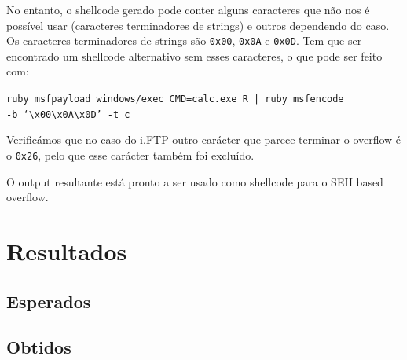 \documentclass[a4paper]{article}
\begin{document}
No entanto, o shellcode gerado pode conter alguns caracteres que não nos é possível usar (caracteres terminadores de strings) e outros dependendo do caso. Os caracteres terminadores de strings são \texttt{0x00}, \texttt{0x0A} e \texttt{0x0D}. Tem que ser encontrado um shellcode alternativo sem esses caracteres, o que pode ser feito com:

	\texttt{ruby msfpayload windows/exec CMD=calc.exe R | ruby msfencode \\ -b `\textbackslash x00\textbackslash x0A\textbackslash x0D' -t c}

Verificámos que no caso do i.FTP outro carácter que parece terminar o overflow é o \texttt{0x26}, pelo que esse carácter também foi excluído.

O output resultante está pronto a ser usado como shellcode para o SEH based overflow.


\pagebreak
\section{Resultados}

\subsection{Esperados}
\subsection{Obtidos}


\pagebreak

\nocite{CorelanTeam, refx86asm, genSEHexploits, AMD64vol3_2013}
\end{document}
